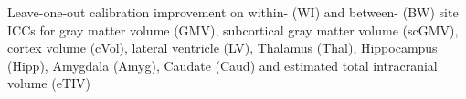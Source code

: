 \label{fig:calib} Leave-one-out calibration improvement on within- (WI) and between- (BW) site ICCs for gray matter volume (GMV), subcortical gray matter volume (scGMV), cortex volume (cVol), lateral ventricle (LV), Thalamus (Thal), Hippocampus (Hipp), Amygdala (Amyg), Caudate (Caud) and estimated total intracranial volume (eTIV)